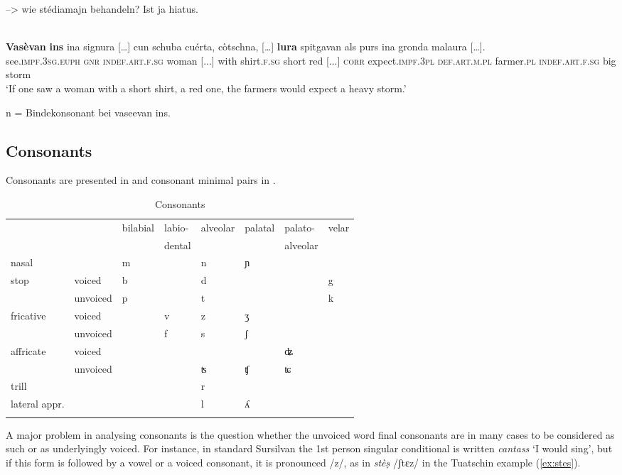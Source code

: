 --> wie stédiamajn behandeln? Ist ja hiatus.


\ea
\label{}
\\
\gll    \textbf{Vasèvan} \textbf{ins} ina signura […] cun schuba cuérta, còtschna, […] \textbf{lura} spitgavan als purs ina gronda malaura […].\\
see.\textsc{impf.3sg.euph} \textsc{gnr} \textsc{indef.art.f.sg} woman [...] with shirt.\textsc{f.sg} short red [...] \textsc{corr} expect.\textsc{impf.3pl} \textsc{def.art.m.pl} farmer.\textsc{pl} \textsc{indef.art.f.sg} big storm\\
\glt `If one saw a woman with a short shirt, a red one, the farmers would expect a heavy storm.'
\z

n = Bindekonsonant bei vaseevan ins.

 
\subsection{Consonants}
Consonants are presented in  and consonant minimal pairs in .

\begin{table}
\caption{Consonants}
\label{cons}
 \begin{tabular}{llllllll}
  \lsptoprule
      &  & bilabial & labio-  & alveolar  &  palatal & palato- &velar\\
     &&& dental &&& alveolar \\
  \midrule
nasal    &    &  m   & &  n       &  	ɲ & \\

stop &voiced   &  b  &   &  d     &  &  & g\\
  & unvoiced   &  p   &      & t  &  & & k\\
fricative  &  voiced  &      & v        & z &  	ʒ\\
  &  unvoiced  &      &   f      & s & ʃ\\
  affricate & voiced & & & &&ʥ \\
  & unvoiced &&&ʦ & ʧ &ʨ\\
trill  &    &      &         & r \\
lateral appr.  &    &      &         & l & ʎ \\
  \lspbottomrule
 \end{tabular}
\end{table}

A major problem in analysing consonants is the question whether the unvoiced word final consonants are in many cases to be considered as such or as underlyingly voiced. For instance, in standard Sursilvan the 1st person singular conditional is written \textit{cantass} `I would sing', but if this form is followed by a vowel or a voiced consonant, it is pronounced /z/, as in \textit{stèṣ} /ʃtɛz/ in the Tuatschin example (\ref{ex:stes}).

